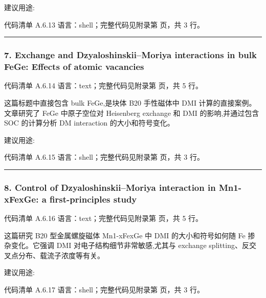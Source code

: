 \documentclass[lang=cn,scheme=chinese,color=blue,device=normal,toc=onecol,math=cm]{elegantbook}
\begin{document}
建议用途:\par


\begin{codeindexbox}{代码清单 A.6.13}
语言：shell；完整代码见附录第 \pageref{code:6:13} 页，共 3 行。
\end{codeindexbox}


\medskip\hrule\medskip


\subsubsection{7. Exchange and Dzyaloshinskii–Moriya interactions in bulk FeGe: Effects of atomic vacancies}


\begin{codeindexbox}{代码清单 A.6.14}
语言：text；完整代码见附录第 \pageref{code:6:14} 页，共 5 行。
\end{codeindexbox}


这篇标题中直接包含 bulk FeGe,是块体 B20 手性磁体中 DMI 计算的直接案例。文章研究了 FeGe 中原子空位对 Heisenberg exchange 和 DMI 的影响,并通过包含 SOC 的计算分析 DM interaction 的大小和符号变化。\par


建议用途:\par


\begin{codeindexbox}{代码清单 A.6.15}
语言：shell；完整代码见附录第 \pageref{code:6:15} 页，共 3 行。
\end{codeindexbox}


\medskip\hrule\medskip


\subsubsection{8. Control of Dzyaloshinskii–Moriya interaction in Mn1-xFexGe: a first-principles study}


\begin{codeindexbox}{代码清单 A.6.16}
语言：text；完整代码见附录第 \pageref{code:6:16} 页，共 5 行。
\end{codeindexbox}


这篇研究 B20 型金属螺旋磁体 Mn1-xFexGe 中 DMI 的大小和符号如何随 Fe 掺杂变化。它强调 DMI 对电子结构细节非常敏感,尤其与 exchange splitting、反交叉点分布、载流子浓度等有关。\par


建议用途:\par


\begin{codeindexbox}{代码清单 A.6.17}
语言：shell；完整代码见附录第 \pageref{code:6:17} 页，共 3 行。
\end{codeindexbox}
\end{document}
